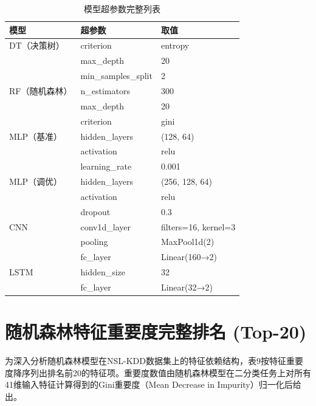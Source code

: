 \begin{table}[htbp]
\centering
\caption{模型超参数完整列表}
\label{tab:hyperparams}
\small
\begin{tabular}{lll}
\toprule
模型 & 超参数 & 取值 \\
\midrule
DT（决策树）  & criterion           & entropy            \\
              & max\_depth          & 20                 \\
              & min\_samples\_split & 2                  \\
\midrule
RF（随机森林） & n\_estimators       & 300                \\
              & max\_depth          & 20                 \\
              & criterion           & gini               \\
\midrule
MLP（基准）   & hidden\_layers      & (128, 64)          \\
              & activation          & relu               \\
              & learning\_rate      & 0.001              \\
\midrule
MLP（调优）   & hidden\_layers      & (256, 128, 64)     \\
              & activation          & relu               \\
              & dropout             & 0.3                \\
\midrule
CNN           & conv1d\_layer       & filters=16, kernel=3              \\
              & pooling             & MaxPool1d(2)                      \\
              & fc\_layer            & Linear(160→2)                     \\
\midrule
LSTM          & hidden\_size         & 32                                \\
              & fc\_layer            & Linear(32→2)                      \\
\bottomrule
\end{tabular}
\end{table}

\section{随机森林特征重要度完整排名 (Top-20)}

为深入分析随机森林模型在NSL-KDD数据集上的特征依赖结构，表9按特征重要度降序列出排名前20的特征项。重要度数值由随机森林模型在二分类任务上对所有41维输入特征计算得到的Gini重要度（Mean Decrease in Impurity）归一化后给出。

